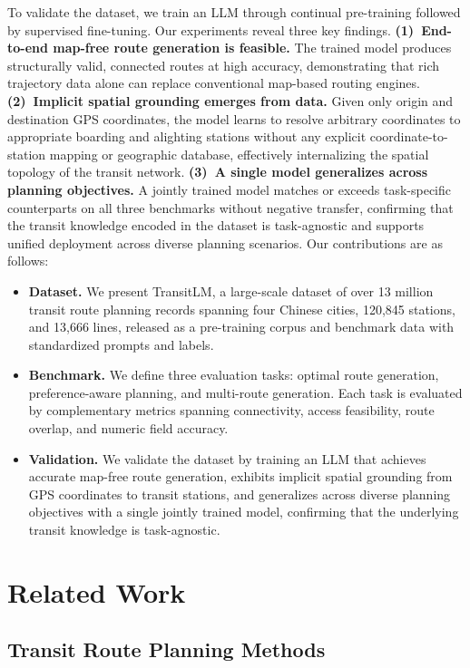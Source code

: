 \documentclass{llmxive}
\begin{document}
To validate the dataset, we train an LLM through continual pre-training followed by supervised fine-tuning. Our experiments reveal three key findings.
\textbf{(1)~End-to-end map-free route generation is feasible.} The trained model produces structurally valid, connected routes at high accuracy, demonstrating that rich trajectory data alone can replace conventional map-based routing engines.
\textbf{(2)~Implicit spatial grounding emerges from data.} Given only origin and destination GPS coordinates, the model learns to resolve arbitrary coordinates to appropriate boarding and alighting stations without any explicit coordinate-to-station mapping or geographic database, effectively internalizing the spatial topology of the transit network.
\textbf{(3)~A single model generalizes across planning objectives.} A jointly trained model matches or exceeds task-specific counterparts on all three benchmarks without negative transfer, confirming that the transit knowledge encoded in the dataset is task-agnostic and supports unified deployment across diverse planning scenarios.
Our contributions are as follows:
\begin{itemize}[left=0pt]
\item \textbf{Dataset.} We present TransitLM, a large-scale dataset of over 13 million transit route planning records spanning four Chinese cities, 120,845 stations, and 13,666 lines, released as a pre-training corpus and benchmark data with standardized prompts and labels.
\item \textbf{Benchmark.} We define three evaluation tasks: optimal route generation, preference-aware planning, and multi-route generation. Each task is evaluated by complementary metrics spanning connectivity, access feasibility, route overlap, and numeric field accuracy.
\item \textbf{Validation.} We validate the dataset by training an LLM that achieves accurate map-free route generation, exhibits implicit spatial grounding from GPS coordinates to transit stations, and generalizes across diverse planning objectives with a single jointly trained model, confirming that the underlying transit knowledge is task-agnostic.
\end{itemize}

\section{Related Work}

\subsection{Transit Route Planning Methods}
\end{document}
